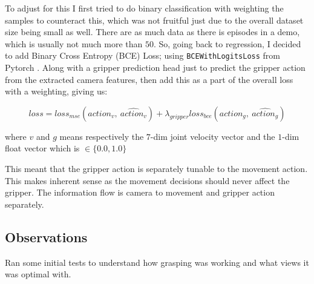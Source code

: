 To adjust for this I first tried to do binary classification with weighting the samples to counteract this, which was not fruitful just due to the overall dataset size being small as well. There are as much data as there is episodes in a demo, which is usually not much more than $50$. So, going back to regression, I decided to add Binary Cross Entropy (BCE) Loss; using \verb|BCEWithLogitsLoss| from Pytorch . Along with a gripper prediction head just to predict the gripper action from the extracted camera features, then add this as a part of the overall loss with a weighting, giving us:

\[
  loss = loss_{mse} \left(action_{v}, ~\widehat{action_v}\right) 
  + 
  \lambda_{gripper} loss_{bce}\left( action_{g}, ~\widehat{action_g}\right)
\]

where $v$ and $g$ means respectively the $7$-dim joint velocity vector and the $1$-dim float vector which is \( \in \{ 0.0, 1.0 \}\)

This meant that the gripper action is separately tunable to the movement action. This makes inherent sense as the movement decisions should never affect the gripper. The information flow is camera to movement and gripper action separately.  



\subsection{Observations}
Ran some initial tests to understand how grasping was working and what views it was optimal with.

